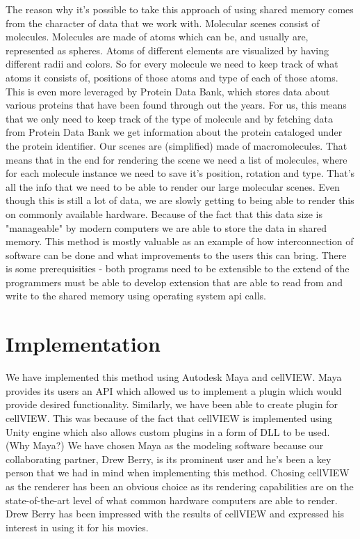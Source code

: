 \documentclass[
  digital, %
  table,   %
  lof,     %
  lot,     %
]{fithesis3}
\begin{document}
The reason why it's possible to take this approach of using shared memory comes from the character of data that we work with. Molecular scenes consist of molecules. Molecules are made of atoms which can be, and usually are, represented as spheres. Atoms of different elements are visualized by having different radii and colors. So for every molecule we need to keep track of what atoms it consists of, positions of those atoms and type of each of those atoms. This is even more leveraged by Protein Data Bank, which stores data about various proteins that have been found through out the years. For us, this means that we only need to keep track of the type of molecule and by fetching data from Protein Data Bank we get information about the protein cataloged under the protein identifier. Our scenes are (simplified) made of macromolecules. That means that in the end for rendering the scene we need a list of molecules, where for each molecule instance we need to save it's position, rotation and type. That's all the info that we need to be able to render our large molecular scenes. Even though this is still a lot of data, we are slowly getting to being able to render this on commonly available hardware. Because of the fact that this data size is "manageable" by modern computers we are able to store the data in shared memory.
This method is mostly valuable as an example of how interconnection of software can be done and what improvements to the users this can bring. There is some prerequisities - both programs need to be extensible to the extend of the programmers must be able to develop extension that are able to read from and write to the shared memory using operating system api calls.

\chapter{Implementation}
We have implemented this method using Autodesk Maya and cellVIEW. Maya provides its users an API which allowed us to implement a plugin which would provide desired functionality. Similarly, we have been able to create plugin for cellVIEW. This was because of the fact that cellVIEW is implemented using Unity engine which also allows custom plugins in a form of DLL to be used.
(Why Maya?) We have chosen Maya as the modeling software because our collaborating partner, Drew Berry, is its prominent user and he's been a key person that we had in mind when implementing this method. Chosing cellVIEW as the renderer has been an obvious choice as its rendering capabilities are on the state-of-the-art level of what common hardware computers are able to render. Drew Berry has been impressed with the results of cellVIEW and expressed his interest in using it for his movies.
\end{document}
